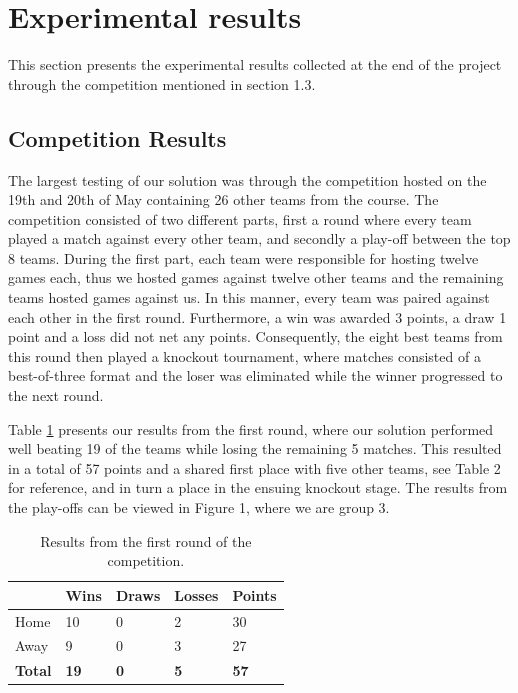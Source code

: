 \documentclass[a4paper,12pt]{article}
\begin{document}
\newpage
\section{Experimental results}
\label{sec:exps}

This section presents the experimental results collected at the end of the project through the competition mentioned in section 1.3.


\subsection{Competition Results}
The largest testing of our solution was through the competition hosted on the 19th and 20th of May containing 26 other teams from the course. The competition consisted of two different parts, first a round where every team played a match against every other team, and secondly a play-off between the top 8 teams. During the first part, each team were responsible for hosting twelve games each, thus we hosted games against twelve other teams and the remaining teams hosted games against us. In this manner, every team was paired against each other in the first round. Furthermore, a win was awarded 3 points, a draw 1 point and a loss did not net any points. Consequently, the eight best teams from this round then played a knockout tournament, where matches consisted of a best-of-three format and the loser was eliminated while the winner progressed to the next round. 

Table \ref{tab:round1} presents our results from the first round, where our solution performed well beating 19 of the teams while losing the remaining 5 matches. This resulted in a total of 57 points and a shared first place with five other teams, see Table 2 for reference, and in turn a place in the ensuing knockout stage. The results from the play-offs can be viewed in Figure 1, where we are group 3.

\begin{table}[ht!]
    \centering
    \begin{tabular}{|l|l|l|l|l|}
        \hline
        & Wins        & Draws      & Losses     & Points      \\ \hline
        Home           & 10          & 0          & 2          & 30          \\ \hline
        Away           & 9           & 0          & 3          & 27          \\ \hline
        \textbf{Total} & \textbf{19} & \textbf{0} & \textbf{5} & \textbf{57} \\ \hline
    \end{tabular}
    \caption{Results from the first round of the competition.}
    \label{tab:round1}
\end{table}
\end{document}
